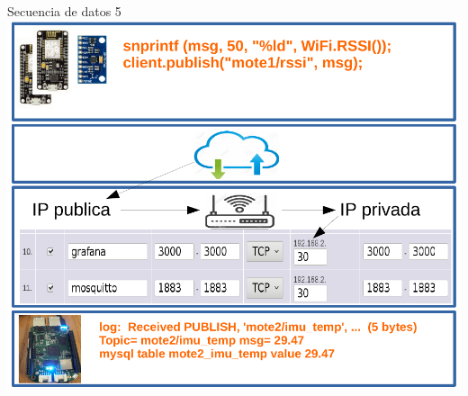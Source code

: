 \documentclass[aspectratio= 43]{beamer}
\begin{document}
\begin{frame}{Secuencia de datos 5}
   \centering \includegraphics [scale=0.62,page=5]{./visio/secuence.pdf}
\end{frame}

\end{document}
